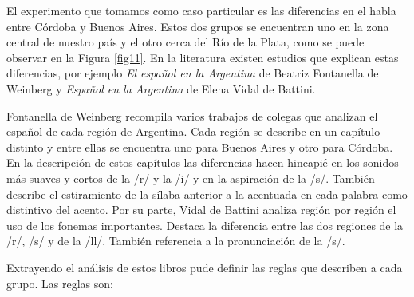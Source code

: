 El experimento que tomamos como caso particular es las diferencias en el habla entre Córdoba y Buenos Aires. Estos dos grupos se encuentran uno en la zona central de nuestro país y el otro cerca del Río de la Plata, como se puede observar en la Figura \ref{fig11}. En la literatura existen estudios que explican estas diferencias, por ejemplo \textit{El español en la Argentina} \cite{Fontanella2000} de Beatriz Fontanella de Weinberg y \textit{Español en la Argentina} \cite{Vidal1964} de Elena Vidal de Battini. 

Fontanella de Weinberg recompila varios trabajos de colegas que analizan el español de cada región de Argentina. Cada región se describe en un capítulo distinto y entre ellas se encuentra uno para Buenos Aires y otro para Córdoba. En la descripción de estos capítulos las diferencias hacen hincapié en los sonidos más suaves y cortos de la /r/ y la /i/ y en la aspiración de la /s/. También describe el estiramiento de la sílaba anterior a la acentuada en cada palabra como distintivo del acento. Por su parte, Vidal de Battini analiza región por región el uso de los fonemas importantes. Destaca la diferencia entre las dos regiones de la /r/, /s/ y de la /ll/. También referencia a la pronunciación de la /s/.

Extrayendo el análisis de estos libros pude definir las reglas que describen a cada grupo. Las reglas son: 

